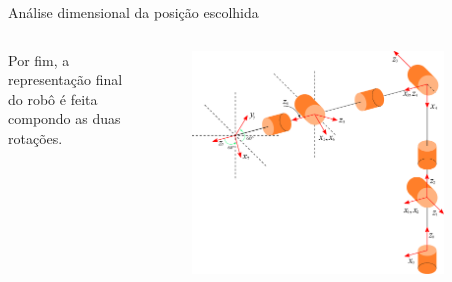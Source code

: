 \documentclass[aspectratio=169]{beamer}
\begin{document}
\begin{frame}{Análise dimensional da posição escolhida}
\begin{columns}
Por fim, a representação final do robô é feita compondo as duas rotações.

\begin{figure}
    \centering
    \includegraphics[width=0.9\textwidth,right]{Fig/pos_escolhida.eps}
\end{figure}
\end{columns}
\end{frame}
\end{document}
